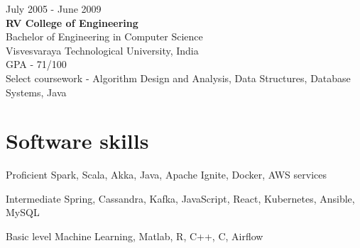 \documentclass{tccv}
\begin{document}
{\hfill\sc July 2005 - June 2009}\\
\textbf{RV College of Engineering}\\
Bachelor of Engineering in Computer Science\\
Visvesvaraya Technological University, India\\
GPA - 71/100\\
Select coursework - Algorithm Design and Analysis, Data Structures, Database Systems, Java\\ 


\vspace{-0.2in}
\section{Software skills}
\begin{factlist}
\item{Proficient}
     {Spark, Scala, Akka, Java, Apache Ignite, Docker, AWS services}

\item{Intermediate}
     {Spring, Cassandra, Kafka, JavaScript, React, Kubernetes, Ansible, MySQL}

\item{Basic level}
     {Machine Learning, Matlab, R, C++, C, Airflow}
\end{factlist}
\end{document}
